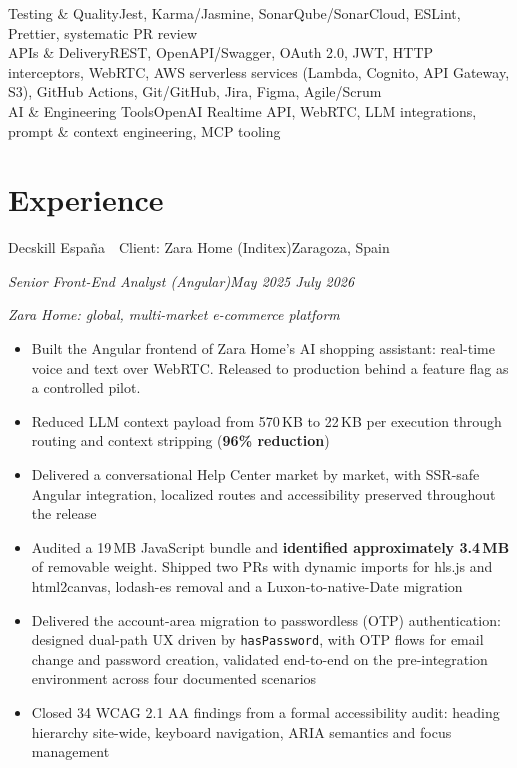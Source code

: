 \documentclass[10pt,a4paper]{article}
\newcommand{\job}[4]{%
  \vspace{5pt}%
  {\latosemibold\color{dark}#1\hfill{\latolight\small\color{light}#2}}\par
  {\itshape\small\color{mid}#3\hfill{\latolight\small\color{light}#4}}\par\vspace{2pt}%
}
\newcommand{\context}[1]{%
  {\latolight\itshape\small\color{mid}\hspace{0.8em}#1}\vspace{2pt}%
}
\newenvironment{items}{%
  \begin{itemize}[leftmargin=1.2em, itemsep=0pt, topsep=2pt, parsep=0pt, label={\color{light}\textbullet}]
    \normalsize\color{dark}
}{%
  \end{itemize}%
}
\newcommand{\skill}[2]{%
  {\normalsize\latosemibold #1\normalfont\enspace\color{mid}#2}\\[3pt]
}
\begin{document}
\skill{Testing \& Quality}{Jest, Karma/Jasmine, SonarQube/SonarCloud, ESLint, Prettier, systematic PR review}

\skill{APIs \& Delivery}{REST, OpenAPI/Swagger, OAuth 2.0, JWT, HTTP interceptors, WebRTC, AWS serverless services (Lambda, Cognito, API Gateway, S3), GitHub Actions, Git/GitHub, Jira, Figma, Agile/Scrum}

\skill{AI \& Engineering Tools}{OpenAI Realtime API, WebRTC, LLM integrations, prompt \& context engineering, MCP tooling}

\section{Experience}

\job{Decskill Espa\~na \,\textperiodcentered\, Client: Zara Home (Inditex)}{Zaragoza, Spain}{Senior Front-End Analyst (Angular)}{May 2025 \textendash{} July 2026}
\context{Zara Home: global, multi-market e-commerce platform}
\begin{items}
  \item Built the Angular frontend of Zara Home's AI shopping assistant: real-time voice and text over WebRTC. Released to production behind a feature flag as a controlled pilot.
  \item Reduced LLM context payload from 570\,KB to 22\,KB per execution through routing and context stripping (\textbf{96\% reduction})
  \item Delivered a conversational Help Center market by market, with SSR-safe Angular integration, localized routes and accessibility preserved throughout the release
  \item Audited a 19\,MB JavaScript bundle and \textbf{identified approximately 3.4\,MB} of removable weight. Shipped two PRs with dynamic imports for hls.js and html2canvas, lodash-es removal and a Luxon-to-native-Date migration
  \item Delivered the account-area migration to passwordless (OTP) authentication: designed dual-path UX driven by \texttt{hasPassword}, with OTP flows for email change and password creation, validated end-to-end on the pre-integration environment across four documented scenarios
  \item Closed 34 WCAG 2.1 AA findings from a formal accessibility audit: heading hierarchy site-wide, keyboard navigation, ARIA semantics and focus management
\end{items}
\end{document}
